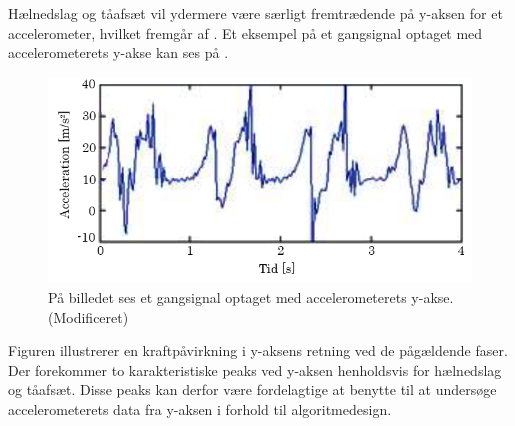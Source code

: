 Hælnedslag og tåafsæt vil ydermere være særligt fremtrædende på y-aksen for et accelerometer, hvilket fremgår af . Et eksempel på et gangsignal optaget med accelerometerets y-akse kan ses på . 
\begin{figure}[H]
	\centering
	\includegraphics[scale=0.7]{figures/bProblemloesning/gang_y_acc.png}
	\caption{På billedet ses et gangsignal optaget med accelerometerets y-akse. \citep{ClelandKikhia2013} (Modificeret)}
	\label{fig:gang_y_acc}
\end{figure}
Figuren illustrerer en kraftpåvirkning i y-aksens retning ved de pågældende faser. Der forekommer to karakteristiske peaks ved y-aksen henholdsvis for hælnedslag og tåafsæt. Disse peaks kan derfor være fordelagtige at benytte til at undersøge accelerometerets data fra y-aksen i forhold til algoritmedesign. %

